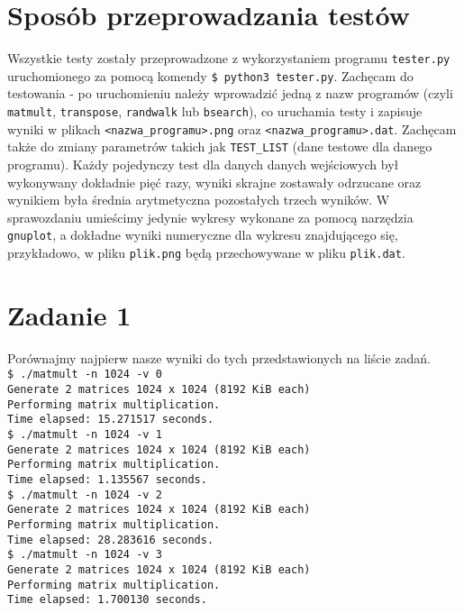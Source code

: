 \documentclass[10pt,wide]{mwart}
\begin{document}
\section{Sposób przeprowadzania testów}
Wszystkie testy zostały przeprowadzone z wykorzystaniem programu \texttt{tester.py} uruchomionego za pomocą komendy \texttt{\$ python3 tester.py}.
Zachęcam do testowania - po uruchomieniu należy wprowadzić jedną z nazw programów (czyli \texttt{matmult}, \texttt{transpose}, \texttt{randwalk} lub \texttt{bsearch}), co uruchamia testy i zapisuje wyniki w plikach \texttt{<nazwa\_programu>.png} oraz \texttt{<nazwa\_programu>.dat}.
Zachęcam także do zmiany parametrów takich jak \texttt{TEST\_LIST} (dane testowe dla danego programu).
Każdy pojedynczy test dla danych danych wejściowych był wykonywany dokładnie pięć razy, wyniki skrajne zostawały odrzucane oraz wynikiem była średnia arytmetyczna pozostałych trzech wyników.
W sprawozdaniu umieścimy jedynie wykresy wykonane za pomocą narzędzia \texttt{gnuplot}, a dokładne wyniki numeryczne dla wykresu znajdującego się, przykładowo, w pliku \texttt{plik.png} będą przechowywane w pliku \texttt{plik.dat}.
 \section{Zadanie 1}
 Porównajmy najpierw nasze wyniki do tych przedstawionych na liście zadań. \\
 \texttt{\$ ./matmult -n 1024 -v 0\\
Generate 2 matrices 1024 x 1024 (8192 KiB each)\\
Performing matrix multiplication.\\
Time elapsed: 15.271517 seconds.\\}
\texttt{\$ ./matmult -n 1024 -v 1\\
Generate 2 matrices 1024 x 1024 (8192 KiB each) \\
Performing matrix multiplication. \\
Time elapsed: 1.135567 seconds.\\}
\texttt{\$ ./matmult -n 1024 -v 2 \\
Generate 2 matrices 1024 x 1024 (8192 KiB each) \\
Performing matrix multiplication. \\
Time elapsed: 28.283616 seconds.\\}
\texttt{\$ ./matmult -n 1024 -v 3\\
Generate 2 matrices 1024 x 1024 (8192 KiB each) \\
Performing matrix multiplication. \\
Time elapsed: 1.700130 seconds.\\}
\end{document}
